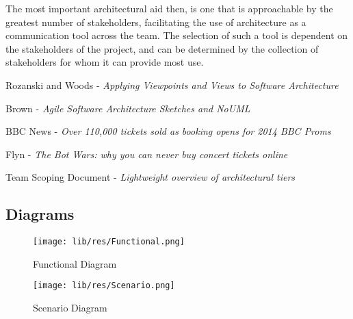 \documentclass[11pt]{article}
\begin{document}
The most important architectural aid then, is one that is approachable by the
greatest number of stakeholders, facilitating the use of architecture as a
communication tool across the team. The selection of such a tool is dependent on
the stakeholders of the project, and can be determined by the collection of
stakeholders for whom it can provide most use.


\begin{thebibliography}{99}
 Rozanski and Woods - \emph{Applying Viewpoints and Views to
  Software Architecture} \\

 Brown - \emph{Agile Software Architecture Sketches and NoUML} \\

 BBC News - \emph{Over 110,000 tickets sold as booking opens for
  2014 BBC Proms} \\

 Flyn - \emph{The Bot Wars: why you can never buy concert tickets
  online} \\

 Team Scoping Document - \emph{Lightweight overview of
  architectural tiers} \\
\end{thebibliography}

\newpage


\subsection*{Diagrams}
\begin{center}

\begin{figure}[h]
\texttt{[image: lib/res/Functional.png]}
\caption{Functional Diagram}
\label{fig:functional}
\end{figure}

\begin{figure}[h]
\texttt{[image: lib/res/Scenario.png]}
\caption{Scenario Diagram}
\label{fig:scenario}
\end{figure}

\end{center}
\end{document}
